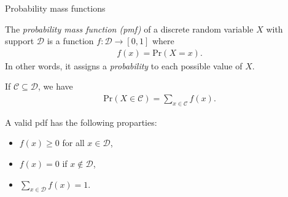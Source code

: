 \documentclass[8pt, handout]{beamer}
\renewcommand{\emph}[1]{\textcolor{defcol}{\textsl{#1}}}
\begin{document}
\begin{frame}{Probability mass functions}


    The \emph{probability mass function (pmf)} of a discrete random variable \(X\) with support \(\mathcal{D}\) is a function \(f : \mathcal{D} \to [0,1]\) where 
    \begin{align*}
        f(x) = \mathrm{Pr}(X = x).
    \end{align*}
    In other words, it assigns a \textsl{probability} to each possible value of \(X\).

    \vspace{2em}
    If \(\mathcal{C} \subseteq \mathcal{D}\), we have 
    \begin{align*}
        \mathrm{Pr}(X \in \mathcal{C}) = \sum_{x \in \mathcal{C}} f(x).
    \end{align*}

    \vspace{2em}
    A valid pdf has the following proparties:
    \begin{itemize}
        \item \(f(x) \ge 0\) for all \(x \in \mathcal{D}\),
        \item \(f(x) = 0\) if \(x \not\in \mathcal{D}\),
        \item \(\sum_{x \in \mathcal{D}} f(x) = 1\).
    \end{itemize}

\end{frame}


\end{document}
